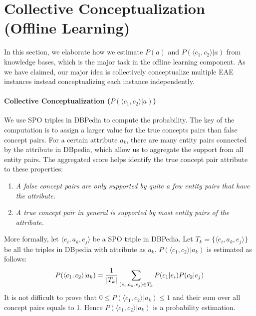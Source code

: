 \section{Collective Conceptualization (Offline Learning)}
In this section, we elaborate how we estimate $P(a)$ and $P( \langle c_{1},c_{2} \rangle |a)$ from knowledge bases, which is the major task in the offline learning component. As we have claimed, our major idea is collectively conceptualize multiple EAE instances instead conceptualizing each instance independently.


\paragraph{Collective Conceptualization ($P( \langle c_{1},c_{2} \rangle |a)$) }
We use SPO triples in DBPedia to compute the probability.
The key of the computation is to assign a larger value for the true concepts pairs than false concept pairs.
For a certain attribute $a_k$, there are many entity pairs connected by the attribute in DBpedia, which allow us to aggregate the support from all entity pairs.
The aggregated score helps identify the true concept pair attribute to these properties:
\begin{enumerate}
\small
\item \emph{A false concept pairs are only supported by quite a few
entity pairs that have the attribute.}
\item \emph{A true concept pair in general is supported by most entity pairs of the attribute.}
\end{enumerate}

More formally, let $ \langle e_i, a_k, e_j \rangle $ be a SPO triple in DBPedia.
Let $T_k=\{\langle e_i, a_k, e_j \rangle\}$ be all the triples in DBpedia with attribute as $a_k$.
$P( \langle c_1, c_2 \rangle |a_k)$ is estimated as follows:
\begin{equation}
\small
P(\langle c_1, c_2\rangle|a_k)= \frac{1}{|T_k|}\sum_{  (e_{i},a_k,e_{j})\in T_k } P(c_1|e_{i})P(c_2|e_{j})
\label{eq:pccga}
\end{equation}
It is not difficult to prove that $0\leq P( \langle c_1, c_2 \rangle |a_k)\leq 1$ and their sum over all concept pairs equals to 1.
Hence $P( \langle c_1, c_2 \rangle |a_k)$ is a probability estimation.


